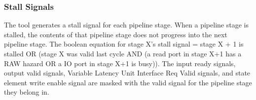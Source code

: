 \subsubsection{Stall Signals}
The tool generates a stall signal for each pipeline stage. When a pipeline stage is stalled, the contents of that pipeline stage does not progress into the next pipeline stage. The boolean equation for stage X's stall signal = stage X + 1 is stalled OR (stage X was valid last cycle AND (a read port in stage X+1 has a RAW hazard OR a IO port in stage X+1 is busy)). The input ready signals, output valid signals, Variable Latency Unit Interface Req Valid signals, and state element write enable signal are masked with the valid signal for the pipeline stage they belong in. 
